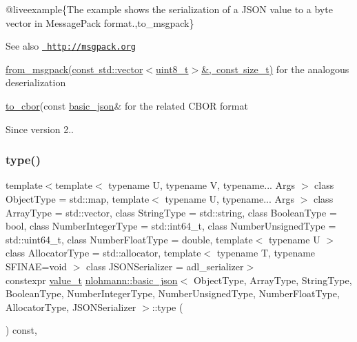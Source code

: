 @liveexample\{The example shows the serialization of a J\+S\+ON value to a byte vector in Message\+Pack format.,to\+\_\+msgpack\}

\begin{DoxySeeAlso}{See also}
\href{http://msgpack.org}{\texttt{ http\+://msgpack.\+org}} 

\mbox{\hyperlink{classnlohmann_1_1basic__json_a3eafe0b1fb2f2c443f1b3fea55c8a470}{from\+\_\+msgpack(const std\+::vector$<$uint8\+\_\+t$>$\&, const size\+\_\+t)}} for the analogous deserialization 

\mbox{\hyperlink{classnlohmann_1_1basic__json_a2566783e190dec524bf3445b322873b8}{to\+\_\+cbor}}(const \mbox{\hyperlink{classnlohmann_1_1basic__json}{basic\+\_\+json}}\& for the related C\+B\+OR format
\end{DoxySeeAlso}
\begin{DoxySince}{Since}
version 2.. 
\end{DoxySince}
\mbox{\label{classnlohmann_1_1basic__json_a2b2d781d7f2a4ee41bc0016e931cadf7}} 
\subsubsection{\texorpdfstring{type()}{type()}}
{\footnotesize\ttfamily template$<$template$<$ typename U, typename V, typename... Args $>$ class Object\+Type = std\+::map, template$<$ typename U, typename... Args $>$ class Array\+Type = std\+::vector, class String\+Type  = std\+::string, class Boolean\+Type  = bool, class Number\+Integer\+Type  = std\+::int64\+\_\+t, class Number\+Unsigned\+Type  = std\+::uint64\+\_\+t, class Number\+Float\+Type  = double, template$<$ typename U $>$ class Allocator\+Type = std\+::allocator, template$<$ typename T, typename S\+F\+I\+N\+A\+E=void $>$ class J\+S\+O\+N\+Serializer = adl\+\_\+serializer$>$ \\
constexpr \mbox{\hyperlink{namespacenlohmann_1_1detail_a90aa5ef615aa8305e9ea20d8a947980f}{value\+\_\+t}} \mbox{\hyperlink{classnlohmann_1_1basic__json}{nlohmann\+::basic\+\_\+json}}$<$ Object\+Type, Array\+Type, String\+Type, Boolean\+Type, Number\+Integer\+Type, Number\+Unsigned\+Type, Number\+Float\+Type, Allocator\+Type, J\+S\+O\+N\+Serializer $>$\+::type (\begin{DoxyParamCaption}{ }\end{DoxyParamCaption}) const\hspace{0.3cm}{\ttfamily [inline]}, {\ttfamily [noexcept]}}



